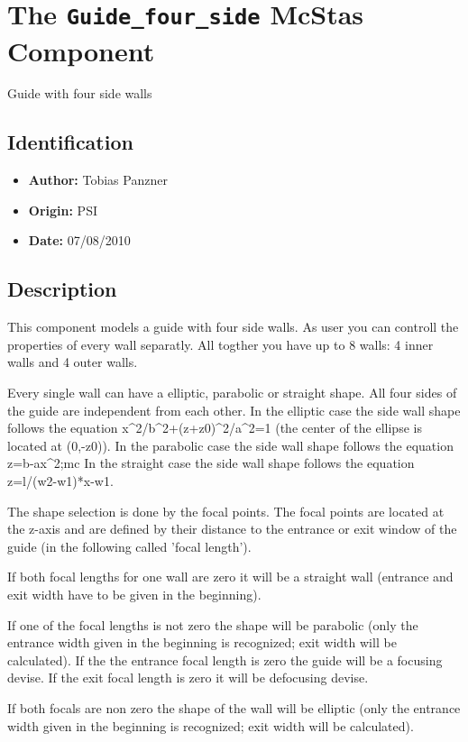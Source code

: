 \section{The \texttt{Guide\_four\_side} McStas Component}
Guide with four side walls

\subsection*{Identification}
\begin{itemize}
  \item \textbf{Author:} Tobias Panzner
  \item \textbf{Origin:} PSI
  \item \textbf{Date:} 07/08/2010
\end{itemize}

\subsection*{Description}
This component models a guide with four side walls. As user you can controll the properties of every wall separatly. All togther you have up to 8 walls: 4 inner walls and 4 outer walls.

Every single wall can have a elliptic, parabolic or straight shape. All four sides of the guide are independent from each other. In the elliptic case the side wall shape follows the equation x\textasciicircum{}2/b\textasciicircum{}2+(z+z0)\textasciicircum{}2/a\textasciicircum{}2=1 (the center of the ellipse is located at (0,-z0)). In the parabolic case the side wall shape follows the equation z=b-ax\textasciicircum{}2;mc In the straight case the side wall shape follows the equation z=l/(w2-w1)*x-w1.

The shape selection is done by the focal points. The focal points are located at the z-axis and are defined by their distance to the entrance or exit window of the guide (in the following called 'focal length').

If both focal lengths for one wall are zero it will be a straight wall (entrance and exit width have to be given in the beginning).

If one of the focal lengths is not zero the shape will be parabolic (only the entrance width given in the beginning is recognized; exit width will be calculated). If the the entrance focal length is zero the guide will be a focusing devise. If the exit focal length is zero it will be defocusing devise.

If both focals are non zero the shape of the wall will be elliptic (only the entrance width given in the beginning is recognized; exit width will be calculated).

